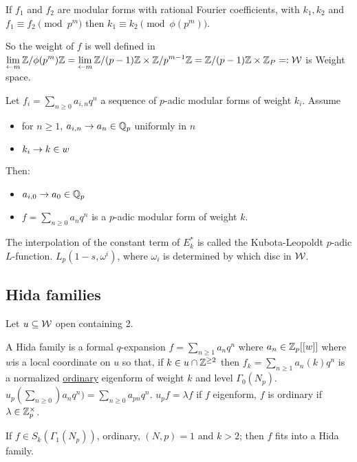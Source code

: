 \documentclass[]{article}
\begin{document}
\begin{theorem}
	If $f_1$ and $f_2$ are modular forms with rational Fourier coefficients, with $k_1,k_2$ and $f_1 \equiv f_2\pmod{p^m}$ then $k_1 \equiv k_2 \pmod{\phi(p^m)}$.
	
	So the weight of $f$ is well defined in $\displaystyle \lim_{\leftarrow m} \mathbb{Z} / \phi(p^m)\mathbb{Z} = \lim_{\leftarrow m} \mathbb{Z}/(p-1)\mathbb{Z} \times \mathbb{Z}/p^{m-1}\mathbb{Z} = \mathbb{Z}/(p-1) \mathbb{Z} \times \mathbb{Z}_P =: \mathcal{W}$ is Weight space.
\end{theorem}
\begin{theorem}
	[Serre] Let $f_i = \sum_{n\geq 0} a_{i,n} q^n$ a sequence of $p$-adic modular forms of weight $k_i$. Assume
	\begin{itemize}
		\item for $n\geq 1$, $a_{i,n} \rightarrow a_n \in \mathbb{Q}_p$ uniformly in $n$
		\item $k_i \rightarrow k \in w$
	\end{itemize}
	Then:
	\begin{itemize}
		\item $a_{i,0} \rightarrow a_0 \in \mathbb{Q}_p$
		\item $f = \sum_{n\geq 0} a_n q^n$ is a $p$-adic modular form of weight $k$.
	\end{itemize}
\end{theorem}
\begin{remark}
	The interpolation of the constant term of $E_k^*$ is called the Kubota-Leopoldt $p$-adic $L$-function. $L_p(1-s,\omega^i)$, where $\omega_i$ is determined by which disc in $\mathcal{W}$.
\end{remark}

\subsection*{Hida families}
Let $u\subseteq \mathcal{W}$ open containing 2.

\begin{definition}
	A Hida family is a formal $q$-expansion $f = \sum_{n\geq 1} a_n q^n$ where $a_n\in \mathbb{Z}_p[[w]]$ where $w$is a local coordinate on $u$ so that, if $k\in u\cap \mathbb{Z}^{\geq 2}$ then $f_k = \sum_{n\geq 1} a_n (k) q^n$ is a normalized \ul{ordinary} eigenform of weight $k$ and level $\Gamma_0(N_p)$.
	$u_p(\sum_{n\geq 0}) a_n q^n) = \sum_{n\geq 0} a_{pn} q^n$. $u_p f = \lambda f$ if $f$ eigenform, $f$ is ordinary if $\lambda \in \mathbb{Z}_p^\times$.
\end{definition}
\begin{theorem}
	[Hida] If $f\in S_k(\Gamma_1(N_p))$, ordinary, $(N,p)=1$ and $k>2$; then $f$ fits into a Hida family.
\end{theorem}
\end{document}
